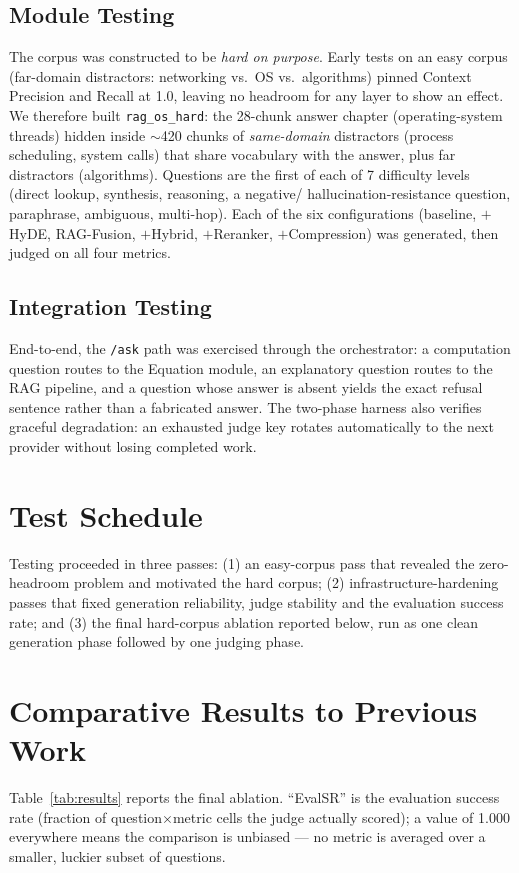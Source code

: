 \documentclass[12pt,a4paper]{report}
\begin{document}
\subsection{Module Testing}
The corpus was constructed to be \emph{hard on purpose}. Early tests on an
easy corpus (far-domain distractors: networking vs.\ OS vs.\ algorithms) pinned
Context Precision and Recall at 1.0, leaving no headroom for any layer to show an
effect. We therefore built \texttt{rag\_os\_hard}: the 28-chunk answer chapter
(operating-system threads) hidden inside $\sim$420 chunks of \emph{same-domain}
distractors (process scheduling, system calls) that share vocabulary with the
answer, plus far distractors (algorithms). Questions are the first of each of 7
difficulty levels (direct lookup, synthesis, reasoning, a negative/
hallucination-resistance question, paraphrase, ambiguous, multi-hop). Each of the
six configurations (baseline, $+$HyDE, RAG-Fusion, $+$Hybrid, $+$Reranker,
$+$Compression) was generated, then judged on all four metrics.

\subsection{Integration Testing}
End-to-end, the \texttt{/ask} path was exercised through the orchestrator: a
computation question routes to the Equation module, an explanatory question routes
to the RAG pipeline, and a question whose answer is absent yields the exact
refusal sentence rather than a fabricated answer. The two-phase harness also
verifies graceful degradation: an exhausted judge key rotates automatically to the
next provider without losing completed work.

\section{Test Schedule}
Testing proceeded in three passes: (1) an easy-corpus pass that revealed the
zero-headroom problem and motivated the hard corpus; (2) infrastructure-hardening
passes that fixed generation reliability, judge stability and the evaluation
success rate; and (3) the final hard-corpus ablation reported below, run as one
clean generation phase followed by one judging phase.

\section{Comparative Results to Previous Work}
Table~\ref{tab:results} reports the final ablation. ``EvalSR'' is the evaluation
success rate (fraction of question$\times$metric cells the judge actually scored);
a value of 1.000 everywhere means the comparison is unbiased --- no metric is
averaged over a smaller, luckier subset of questions.
\end{document}
